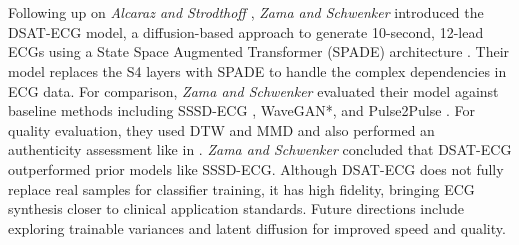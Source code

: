 \\ \\ 
Following up on \textit{Alcaraz and Strodthoff} \cite{alcarazDiffusionbasedConditionalECG2023}, \textit{Zama and Schwenker} introduced the DSAT-ECG model, a diffusion-based approach to generate 10-second, 12-lead ECGs using a State Space Augmented Transformer (SPADE) architecture \cite{zamaECGSynthesisDiffusionBased2023}. Their model replaces the S4 layers with SPADE to handle the complex dependencies in ECG data.
For comparison, \textit{Zama and Schwenker} evaluated their model against baseline methods including SSSD-ECG \cite{alcarazDiffusionbasedConditionalECG2023}, WaveGAN*, and Pulse2Pulse \cite{sangGeneration12LeadElectrocardiogram2022}. For quality evaluation, they used DTW and MMD and also performed an authenticity assessment like in \cite{alcarazDiffusionbasedConditionalECG2023}. \textit{Zama and Schwenker} concluded that DSAT-ECG outperformed prior models like SSSD-ECG. Although DSAT-ECG does not fully replace real samples for classifier training, it has high fidelity, bringing ECG synthesis closer to clinical application standards. Future directions include exploring trainable variances and latent diffusion for improved speed and quality.
\\ \\


